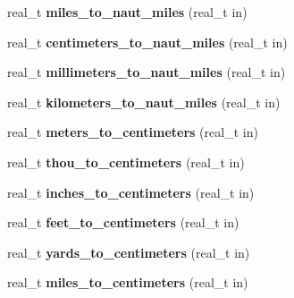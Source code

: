 \begin{DoxyCompactItemize}
\item 
\hypertarget{namespaceetk_a541ee8a7b8ff4ce4dbc0b100c99ea220}{real\-\_\-t {\bfseries miles\-\_\-to\-\_\-naut\-\_\-miles} (real\-\_\-t in)}\label{namespaceetk_a541ee8a7b8ff4ce4dbc0b100c99ea220}

\item 
\hypertarget{namespaceetk_ac949efacc3806bf28f903609f93919d1}{real\-\_\-t {\bfseries centimeters\-\_\-to\-\_\-naut\-\_\-miles} (real\-\_\-t in)}\label{namespaceetk_ac949efacc3806bf28f903609f93919d1}

\item 
\hypertarget{namespaceetk_afec1782de787985f1db61457eadca1e8}{real\-\_\-t {\bfseries millimeters\-\_\-to\-\_\-naut\-\_\-miles} (real\-\_\-t in)}\label{namespaceetk_afec1782de787985f1db61457eadca1e8}

\item 
\hypertarget{namespaceetk_a13255db094b2f03cb50439ffaeb9af36}{real\-\_\-t {\bfseries kilometers\-\_\-to\-\_\-naut\-\_\-miles} (real\-\_\-t in)}\label{namespaceetk_a13255db094b2f03cb50439ffaeb9af36}

\item 
\hypertarget{namespaceetk_adfff0bcf4f8e75474fb1e2d5ad4aaffe}{real\-\_\-t {\bfseries meters\-\_\-to\-\_\-centimeters} (real\-\_\-t in)}\label{namespaceetk_adfff0bcf4f8e75474fb1e2d5ad4aaffe}

\item 
\hypertarget{namespaceetk_a42b0c0d560eb35f3485b4ab7002a8667}{real\-\_\-t {\bfseries thou\-\_\-to\-\_\-centimeters} (real\-\_\-t in)}\label{namespaceetk_a42b0c0d560eb35f3485b4ab7002a8667}

\item 
\hypertarget{namespaceetk_a5040c09fb2be46e80151464104d876ef}{real\-\_\-t {\bfseries inches\-\_\-to\-\_\-centimeters} (real\-\_\-t in)}\label{namespaceetk_a5040c09fb2be46e80151464104d876ef}

\item 
\hypertarget{namespaceetk_a6d423f330d7df09fe4637dc829bd882e}{real\-\_\-t {\bfseries feet\-\_\-to\-\_\-centimeters} (real\-\_\-t in)}\label{namespaceetk_a6d423f330d7df09fe4637dc829bd882e}

\item 
\hypertarget{namespaceetk_a21049ed5a01546364a70db1b19f3a2cd}{real\-\_\-t {\bfseries yards\-\_\-to\-\_\-centimeters} (real\-\_\-t in)}\label{namespaceetk_a21049ed5a01546364a70db1b19f3a2cd}

\item 
\hypertarget{namespaceetk_a2a8911afa4dec0813cea90ddb4de28b9}{real\-\_\-t {\bfseries miles\-\_\-to\-\_\-centimeters} (real\-\_\-t in)}\label{namespaceetk_a2a8911afa4dec0813cea90ddb4de28b9}


\end{DoxyCompactItemize}
